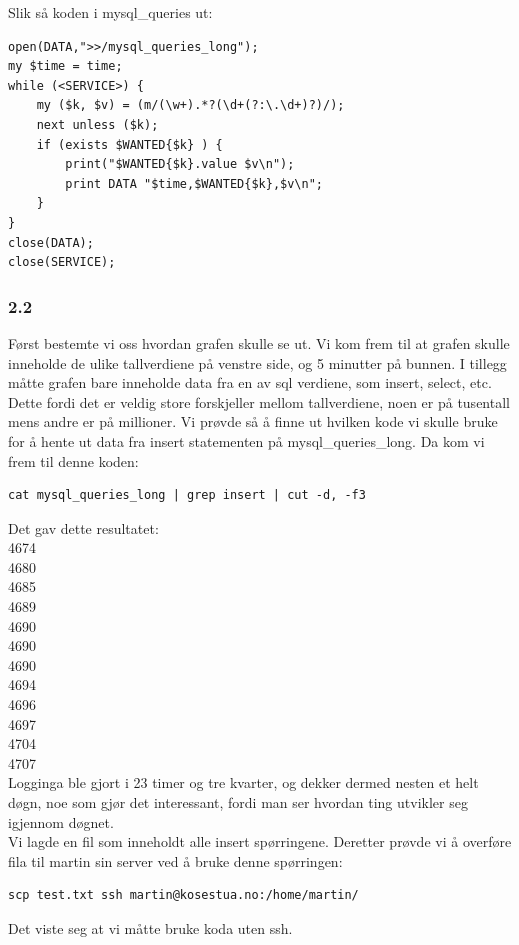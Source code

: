 \documentclass[a4paper, norsk, 12pt]{article}
\begin{document}
Slik så koden i mysql\_queries ut:
\begin{verbatim}
open(DATA,">>/mysql_queries_long");
my $time = time;
while (<SERVICE>) {
    my ($k, $v) = (m/(\w+).*?(\d+(?:\.\d+)?)/);
    next unless ($k);
    if (exists $WANTED{$k} ) {
        print("$WANTED{$k}.value $v\n");
        print DATA "$time,$WANTED{$k},$v\n";
    }
}
close(DATA);
close(SERVICE);
\end{verbatim}

\subsubsection*{2.2}
Først bestemte vi oss hvordan grafen skulle se ut. Vi kom frem til at grafen skulle inneholde de ulike tallverdiene på venstre side, og 5 minutter på bunnen. I tillegg måtte grafen bare inneholde data fra en av sql verdiene, som insert, select, etc. Dette fordi det er veldig store forskjeller mellom tallverdiene, noen er på tusentall mens andre er på millioner. Vi prøvde så å finne ut hvilken kode vi skulle bruke for å hente ut data fra insert statementen på mysql\_queries\_long. Da kom vi frem til denne koden:

\begin{verbatim}
cat mysql_queries_long | grep insert | cut -d, -f3
\end{verbatim}

Det gav dette resultatet:\\
4674\\
4680\\
4685\\
4689\\
4690\\
4690\\
4690\\
4694\\
4696\\
4697\\
4704\\
4707\\

Logginga ble gjort i 23 timer og tre kvarter, og dekker dermed nesten et helt døgn, noe som gjør det interessant, fordi man ser hvordan ting utvikler seg igjennom døgnet.\\

Vi lagde en fil som inneholdt alle insert spørringene. Deretter prøvde vi å overføre fila til martin sin server ved å bruke denne spørringen:
\begin{verbatim}
scp test.txt ssh martin@kosestua.no:/home/martin/
\end{verbatim}
Det viste seg at vi måtte bruke koda uten ssh.\\
\end{document}
